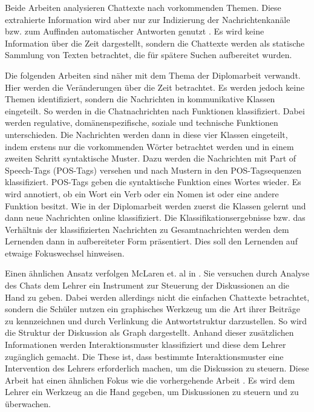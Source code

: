 Beide Arbeiten analysieren Chattexte nach vorkommenden Themen. Diese extrahierte Information wird aber nur zur Indizierung der Nachrichtenkanäle \citep{TMAndSocialNetworks} bzw. zum Auffinden automatischer Antworten genutzt \citep{discussion_Kim2008Scaffolding}. Es wird keine Information über die Zeit dargestellt, sondern die Chattexte werden als statische Sammlung von Texten betrachtet, die für spätere Suchen aufbereitet wurden.

Die folgenden Arbeiten sind näher mit dem Thema der Diplomarbeit verwandt. Hier werden die Veränderungen über die Zeit betrachtet. Es werden jedoch keine Themen identifiziert, sondern die Nachrichten in kommunikative Klassen eingeteilt. So werden in \citet{Anjewerden2007} die Chatnachrichten nach Funktionen klassifiziert. Dabei werden regulative, domänenspezifische, soziale und technische Funktionen unterschieden. Die Nachrichten werden dann in diese vier Klassen eingeteilt, indem erstens nur die vorkommenden Wörter betrachtet werden und in einem zweiten Schritt syntaktische Muster. Dazu werden die Nachrichten mit Part of Speech-Tags (POS-Tags) versehen und nach Mustern in den POS-Tagsequenzen klassifiziert. POS-Tags geben die syntaktische Funktion eines Wortes wieder. Es wird annotiert, ob ein Wort ein Verb oder ein Nomen ist oder eine andere Funktion besitzt. Wie in der Diplomarbeit werden zuerst die Klassen gelernt und dann neue Nachrichten online klassifiziert. Die Klassifikationsergebnisse bzw. das Verhältnis der klassifizierten Nachrichten zu Gesamtnachrichten werden dem Lernenden dann in aufbereiteter Form präsentiert. Dies soll den Lernenden auf etwaige Fokuswechsel hinweisen.

Einen ähnlichen Ansatz verfolgen McLaren et. al in \citep{Scheuer2008Helping,Miksatko2008Whats,Mclaren2007Using}. Sie versuchen durch Analyse des Chats dem Lehrer ein Instrument zur Steuerung der Diskussionen an die Hand zu geben. Dabei werden allerdings nicht die einfachen Chattexte betrachtet, sondern die Schüler nutzen ein graphisches Werkzeug um die Art ihrer Beiträge zu kennzeichnen und durch Verlinkung die Antwortstruktur darzustellen. So wird die Struktur der Diskussion als Graph dargestellt. Anhand dieser zusätzlichen Informationen werden Interaktionsmuster klassifiziert und diese dem Lehrer zugänglich gemacht. Die These ist, dass bestimmte Interaktionsmuster eine Intervention des Lehrers erforderlich machen, um die Diskussion zu steuern. Diese Arbeit hat einen ähnlichen Fokus wie die vorhergehende Arbeit \citep{discussion_Kim2008Scaffolding}. Es wird dem Lehrer ein Werkzeug an die Hand gegeben, um Diskussionen zu steuern und zu überwachen. 

